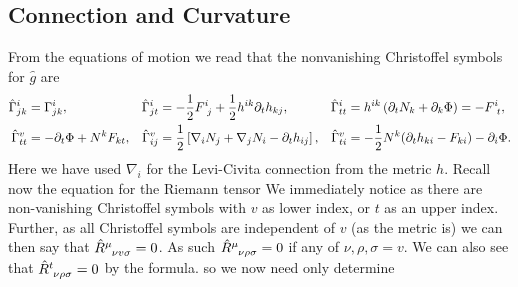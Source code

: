 \documentclass{article}
\begin{document}
\subsection{Connection and Curvature}
From the equations of motion we read that the nonvanishing Christoffel symbols for $\hat g$ are
\begin{align*}
\hat \Gamma\sp{i}_{jk}&=  \Gamma\sp{i}_{jk},
&\hat \Gamma\sp{i}_{jt}&=-\frac12 F\sp{i}_{\ j}+\frac12 h\sp{ik}\partial_t h_{kj},
&\hat \Gamma\sp{i}_{tt}&=h\sp{ik} \left( \partial_t N_k +\partial_{k} \Phi \right)= -F\sp{i}_{\ t},
\\
\hat \Gamma\sp{v}_{tt}&=-\partial_t \Phi+N\sp{k}F_{kt}, 
&\hat \Gamma\sp{v}_{ij}&=\frac12\left[\nabla_{i}N_{j}+\nabla_{j}N_{i}-\partial_t h_{ij}\right],
&\hat \Gamma\sp{v}_{ti}&=-\frac12 N\sp{k} (\partial_t h_{ki} -F_{ki}) -\partial_i\Phi .
\end{align*}
Here we have used $\nabla_i$ for the Levi-Civita connection from the metric $h$. Recall now the equation for the Riemann tensor 
We immediately notice 
as there are non-vanishing Christoffel symbols with $v$ as lower index, or $t$ as an upper index. \\
Further, as all Christoffel symbols are independent of $v$ (as the metric is) we can then say that $\hat{R}\indices{^\mu_\nu_v_\sigma} = 0$. As such $\hat{R}\indices{^\mu_\nu_\rho_\sigma}=0$ if any of $\nu,\rho,\sigma=v$. We can also see that $\hat{R}\indices{^t_\nu_\rho_\sigma}=0$ by the formula. so we now need only determine
\end{document}
